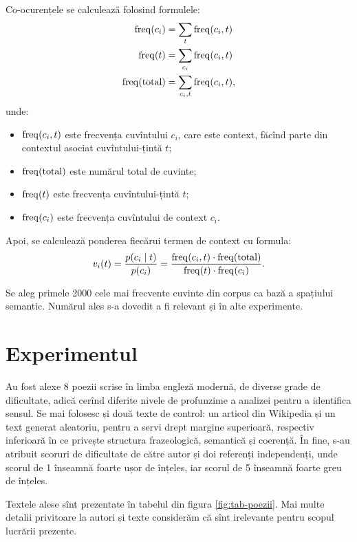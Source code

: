 Co-ocurențele se calculează folosind formulele:
\begin{align*}
  \mathrm{freq}(c_i) &= \displaystyle\sum_t \mathrm{freq}(c_i, t) \\
  \mathrm{freq}(t) &= \sum_{c_i} \mathrm{freq}(c_i, t) \\
  \mathrm{freq}(\text{total}) &= \sum_{c_i, t} \mathrm{freq}(c_i, t),
\end{align*}
unde:
\begin{itemize}
\item $ \mathrm{freq}(c_i, t) $ este frecvența cuvîntului $ c_i $, care este
  context, făcînd parte din contextul asociat cuvîntului-țintă $ t $;
\item $ \mathrm{freq}(\mathrm{total}) $ este numărul total de cuvinte;
\item $ \mathrm{freq}(t) $ este frecvența cuvîntului-țintă $ t $;
\item $ \mathrm{freq}(c_i) $ este frecvența cuvîntului de context $ c_i $.
\end{itemize}

Apoi, se calculează ponderea fiecărui termen de context cu formula:
\[
  v_i(t) = \dfrac{p(c_i \mid t)}{p(c_i)} = \dfrac{\dr{freq}(c_i, t) \cdot %
    \dr{freq}(\text{total})}{\dr{freq}(t) \cdot \dr{freq}(c_i)}.
\]

Se aleg primele 2000 cele mai frecvente cuvinte din corpus ca bază
a spațiului semantic. Numărul ales s-a dovedit a fi relevant și în
alte experimente.


\section{Experimentul}

Au fost alexe 8 poezii scrise în limba engleză modernă, de diverse grade de
dificultate, adică cerînd diferite nivele de profunzime a analizei pentru
a identifica sensul. Se mai folosesc și două texte de control: un articol
din Wikipedia și un text generat aleatoriu, pentru a servi drept margine
superioară, respectiv inferioară în ce privește structura frazeologică,
semantică și coerență. În fine, s-au atribuit scoruri de dificultate de către
autor și doi referenți independenți, unde scorul de 1 înseamnă foarte ușor
de înțeles, iar scorul de 5 înseamnă foarte greu de înțeles.

Textele alese sînt prezentate în tabelul din figura \ref{fig:tab-poezii}.
Mai multe detalii privitoare la autori și texte considerăm că sînt irelevante
pentru scopul lucrării prezente.

